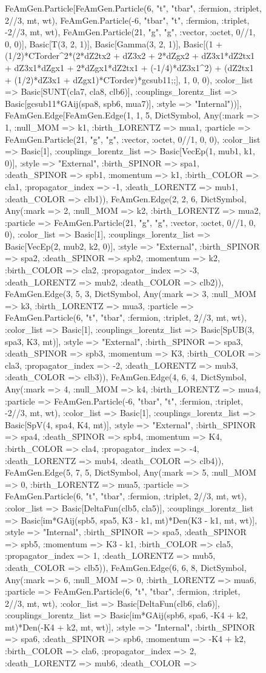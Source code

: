 \documentclass{revtex4}
\begin{document}
\begin{figure}[!htb]
\begin{center}
{FeAmGen.Particle[FeAmGen.Particle(6, "t", "tbar", :fermion, :triplet, 2//3, mt, wt), FeAmGen.Particle(-6, "tbar", "t", :fermion, :triplet, -2//3, mt, wt), FeAmGen.Particle(21, "g", "g", :vector, :octet, 0//1, 0, 0)], Basic[T(3, 2, 1)], Basic[Gamma(3, 2, 1)], Basic[(1 + (1/2)*CTorder^2*(2*dZ2tx2 + dZ3x2 + 2*dZgx2 + dZ3x1*dZ2tx1 + dZ3x1*dZgx1 + 2*dZgx1*dZ2tx1 + (-1/4)*dZ3x1^2) + (dZ2tx1 + (1/2)*dZ3x1 + dZgx1)*CTorder)*gcsub11;;], 1, 0, 0), :color_list => Basic[SUNT(cla7, cla8, clb6)], :couplings_lorentz_list => Basic[gcsub11*GAij(spa8, spb6, mua7)], :style => "Internal"))], FeAmGen.Edge[FeAmGen.Edge(1, 1, 5, Dict{Symbol, Any}(:mark => 1, :null_MOM => k1, :birth_LORENTZ => mua1, :particle => FeAmGen.Particle(21, "g", "g", :vector, :octet, 0//1, 0, 0), :color_list => Basic[1], :couplings_lorentz_list => Basic[VecEp(1, mub1, k1, 0)], :style => "External", :birth_SPINOR => spa1, :death_SPINOR => spb1, :momentum => k1, :birth_COLOR => cla1, :propagator_index => -1, :death_LORENTZ => mub1, :death_COLOR => clb1)), FeAmGen.Edge(2, 2, 6, Dict{Symbol, Any}(:mark => 2, :null_MOM => k2, :birth_LORENTZ => mua2, :particle => FeAmGen.Particle(21, "g", "g", :vector, :octet, 0//1, 0, 0), :color_list => Basic[1], :couplings_lorentz_list => Basic[VecEp(2, mub2, k2, 0)], :style => "External", :birth_SPINOR => spa2, :death_SPINOR => spb2, :momentum => k2, :birth_COLOR => cla2, :propagator_index => -3, :death_LORENTZ => mub2, :death_COLOR => clb2)), FeAmGen.Edge(3, 5, 3, Dict{Symbol, Any}(:mark => 3, :null_MOM => k3, :birth_LORENTZ => mua3, :particle => FeAmGen.Particle(6, "t", "tbar", :fermion, :triplet, 2//3, mt, wt), :color_list => Basic[1], :couplings_lorentz_list => Basic[SpUB(3, spa3, K3, mt)], :style => "External", :birth_SPINOR => spa3, :death_SPINOR => spb3, :momentum => K3, :birth_COLOR => cla3, :propagator_index => -2, :death_LORENTZ => mub3, :death_COLOR => clb3)), FeAmGen.Edge(4, 6, 4, Dict{Symbol, Any}(:mark => 4, :null_MOM => k4, :birth_LORENTZ => mua4, :particle => FeAmGen.Particle(-6, "tbar", "t", :fermion, :triplet, -2//3, mt, wt), :color_list => Basic[1], :couplings_lorentz_list => Basic[SpV(4, spa4, K4, mt)], :style => "External", :birth_SPINOR => spa4, :death_SPINOR => spb4, :momentum => K4, :birth_COLOR => cla4, :propagator_index => -4, :death_LORENTZ => mub4, :death_COLOR => clb4)), FeAmGen.Edge(5, 7, 5, Dict{Symbol, Any}(:mark => 5, :null_MOM => 0, :birth_LORENTZ => mua5, :particle => FeAmGen.Particle(6, "t", "tbar", :fermion, :triplet, 2//3, mt, wt), :color_list => Basic[DeltaFun(clb5, cla5)], :couplings_lorentz_list => Basic[im*GAij(spb5, spa5, K3 - k1, mt)*Den(K3 - k1, mt, wt)], :style => "Internal", :birth_SPINOR => spa5, :death_SPINOR => spb5, :momentum => K3 - k1, :birth_COLOR => cla5, :propagator_index => 1, :death_LORENTZ => mub5, :death_COLOR => clb5)), FeAmGen.Edge(6, 6, 8, Dict{Symbol, Any}(:mark => 6, :null_MOM => 0, :birth_LORENTZ => mua6, :particle => FeAmGen.Particle(6, "t", "tbar", :fermion, :triplet, 2//3, mt, wt), :color_list => Basic[DeltaFun(clb6, cla6)], :couplings_lorentz_list => Basic[im*GAij(spb6, spa6, -K4 + k2, mt)*Den(-K4 + k2, mt, wt)], :style => "Internal", :birth_SPINOR => spa6, :death_SPINOR => spb6, :momentum => -K4 + k2, :birth_COLOR => cla6, :propagator_index => 2, :death_LORENTZ => mub6, :death_COLOR => }
\end{center}
\end{figure}
\end{document}
